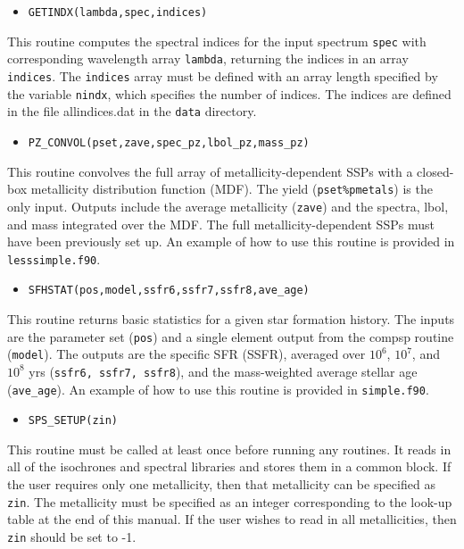 \documentclass[]{article}
\begin{document}
\begin{itemize}
\item \texttt{GETINDX(lambda,spec,indices)}
\end{itemize}

This routine computes the spectral indices for the input spectrum \texttt{spec}
with corresponding wavelength array \texttt{lambda}, returning the indices in an
array \texttt{indices}.  The \texttt{indices} array must be defined with an
array length specified by the variable \texttt{nindx}, which specifies the
number of indices.  The indices are defined in the file allindices.dat in the
\texttt{data} directory.

\begin{itemize}
\item \texttt{PZ\_CONVOL(pset,zave,spec\_pz,lbol\_pz,mass\_pz)}
\end{itemize}

This routine convolves the full array of metallicity-dependent SSPs with a
closed-box metallicity distribution function (MDF).  The yield
(\texttt{pset\%pmetals}) is the only input.  Outputs include the average
metallicity (\texttt{zave}) and the spectra, lbol, and mass integrated over the
MDF.  The full metallicity-dependent SSPs must have been previously set up.  An
example of how to use this routine is provided in \texttt{lesssimple.f90}.


\begin{itemize}
\item \texttt{SFHSTAT(pos,model,ssfr6,ssfr7,ssfr8,ave\_age)}
\end{itemize}

This routine returns basic statistics for a given star formation history.  The
inputs are the parameter set (\texttt{pos}) and a single element output from the
compsp routine (\texttt{model}).  The outputs are the specific SFR (SSFR),
averaged over $10^6$, $10^7$, and $10^8$ yrs (\texttt{ssfr6, ssfr7, ssfr8}), and
the mass-weighted average stellar age (\texttt{ave\_age}).  An example of how to
use this routine is provided in \texttt{simple.f90}.


\begin{itemize}
\item \texttt{SPS\_SETUP(zin)}
\end{itemize}

This routine must be called at least once before running any routines. It reads
in all of the isochrones and spectral libraries and stores them in a common
block.  If the user requires only one metallicity, then that metallicity can be
specified as \texttt{zin}.  The metallicity must be specified as an integer
corresponding to the look-up table at the end of this manual.  If the user
wishes to read in all metallicities, then \texttt{zin} should be set to -1.
\end{document}
